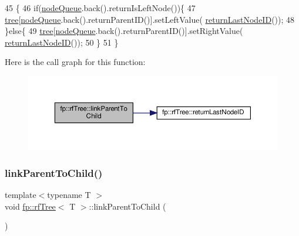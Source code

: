 \begin{DoxyCode}
45                                                \{
46                     \textcolor{keywordflow}{if}(\hyperlink{classfp_1_1rfTree_af72d0a2f930fd480dfb4858885c2df23}{nodeQueue}.back().returnIsLeftNode())\{
47                         \hyperlink{classfp_1_1rfTree_a1d5c209715f4044a85878c17e2b3ee53}{tree}[\hyperlink{classfp_1_1rfTree_af72d0a2f930fd480dfb4858885c2df23}{nodeQueue}.back().returnParentID()].setLeftValue(
      \hyperlink{classfp_1_1rfTree_a1b8c04f3f3ce362d9627c2ca66d10efd}{returnLastNodeID}());
48                     \}\textcolor{keywordflow}{else}\{
49                         \hyperlink{classfp_1_1rfTree_a1d5c209715f4044a85878c17e2b3ee53}{tree}[\hyperlink{classfp_1_1rfTree_af72d0a2f930fd480dfb4858885c2df23}{nodeQueue}.back().returnParentID()].setRightValue(
      \hyperlink{classfp_1_1rfTree_a1b8c04f3f3ce362d9627c2ca66d10efd}{returnLastNodeID}());
50                     \}
51                 \}
\end{DoxyCode}
Here is the call graph for this function\+:
\nopagebreak
\begin{figure}[H]
\begin{center}
\leavevmode
\includegraphics[width=350pt]{classfp_1_1rfTree_aceaedc5d54bb429c1a3539f164a93d45_cgraph}
\end{center}
\end{figure}
\mbox{\label{classfp_1_1rfTree_aceaedc5d54bb429c1a3539f164a93d45}} 
\subsubsection{\texorpdfstring{link\+Parent\+To\+Child()}{linkParentToChild()}\hspace{0.1cm}{\footnotesize\ttfamily [2/2]}}
{\footnotesize\ttfamily template$<$typename T $>$ \\
void \hyperlink{classfp_1_1rfTree}{fp\+::rf\+Tree}$<$ T $>$\+::link\+Parent\+To\+Child (\begin{DoxyParamCaption}{ }\end{DoxyParamCaption})\hspace{0.3cm}{\ttfamily [inline]}}



